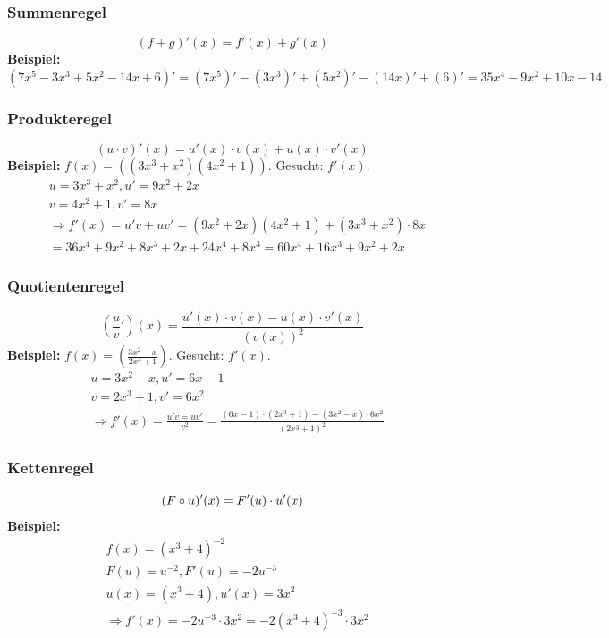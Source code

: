 \subsubsection{Summenregel}
\[
    (f+g)'(x) = f'(x) + g'(x)
\]
\textbf{Beispiel: } $(7x^5-3x^3+5x^2-14x+6)' = (7x^5)' - (3x^3)' + (5x^2)' - (14x)' + (6)' = 35x^4-9x^2+10x-14$

\subsubsection{Produkteregel}
\[
    (u \cdot v)'(x) = u'(x) \cdot v(x) + u(x) \cdot v'(x)
\]
\textbf{Beispiel: }  $f(x) = ((3x^3 + x^2)(4x^2+1))$. Gesucht: $f'(x)$.
\begin{align*}
    &u = 3x^3 + x^2, u'=9x^2 + 2x \\
    &v=4x^2+1, v'=8x \\
    &\Rightarrow f'(x) = u'v + uv' = (9x^2+2x)(4x^2+1)+(3x^3+x^2) \cdot 8x \\
    &= 36x^4 + 9x^2 + 8x^3 + 2x + 24x^4 + 8x^3 = 60x^4 + 16x^3 + 9x^2 + 2x
\end{align*}

\subsubsection{Quotientenregel}
\[
    (\frac{u}{v}')(x)=\frac{u'(x) \cdot v(x) - u(x) \cdot v'(x)}{(v(x))^2}
\]
\textbf{Beispiel: } $f(x) = (\frac{3x^2-x}{2x^3+1})$. Gesucht: $f'(x)$.
\begin{align*}
    &u = 3x^2-x, u' = 6x-1 \\
    &v = 2x^3+1, v' = 6x^2 \\
    &\Rightarrow f'(x) = \frac{u'v = uv'}{v^2} = \frac{(6x-1)\cdot (2x^3 + 1)- (3x^2-x) \cdot 6x^2}{(2x^3+1)^2}
\end{align*}

\subsubsection{Kettenregel}
\[
    (F \circ u)'(x) = F'(u) \cdot u'(x) \\
\]
\textbf{Beispiel: }
\begin{align*}
    &f(x)=(x^3+4)^{-2} \\
    &F(u) = u^{-2}, F'(u)=-2u^{-3} \\
    &u(x) = (x^3+4), u'(x)=3x^2 \\
    &\Rightarrow f'(x)=-2u^{-3} \cdot 3x^2 = -2(x^3 + 4)^{-3} \cdot 3x^2
\end{align*}

